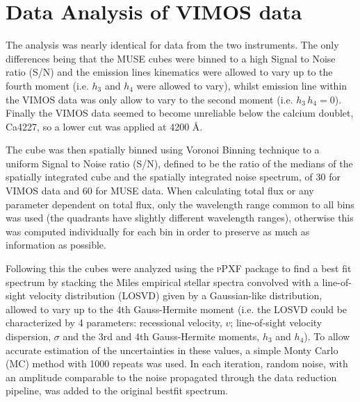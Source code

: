 \documentclass[fleqn,usenatbib,useAMS]{mnras}
\begin{document}


\section{Data Analysis of VIMOS data}
	\label{sec:analysis}
	The analysis was nearly identical for data from the two instruments. The only differences being that the MUSE cubes were binned to a high Signal to Noise ratio (S/N) and the emission lines kinematics were allowed to vary up to the fourth moment (i.e. $h_3$ and $h_4$ were allowed to vary), whilst emission line within the VIMOS data was only allow to vary to the second moment (i.e. $h_3 \, h_4 = 0$). Finally the VIMOS data seemed to become unreliable below the calcium doublet, Ca4227, so a lower cut was applied at 4200 \AA. 


	The cube was then spatially binned using Voronoi Binning technique \citep{Cappellari2003} to a uniform Signal to Noise ratio (S/N), defined to be the ratio of the medians of the spatially integrated cube and the spatially integrated noise spectrum, of 30 for VIMOS data and 60 for MUSE data. %
	When calculating total flux or any parameter dependent on total flux, only the wavelength range common to all bins was used (the quadrants have slightly different wavelength ranges), otherwise this was computed individually for each bin in order to preserve as much as information as possible.

	Following this the cubes were analyzed using the \textsc{pPXF} package \citep{Cappellari2004} to find a best fit spectrum by stacking the Miles empirical stellar spectra \citep{Sanchez-Blazquez2006} convolved with a line-of-sight velocity distribution (LOSVD) given by a Gaussian-like distribution, allowed to vary up to the 4th Gauss-Hermite moment (i.e. the LOSVD could be characterized by 4 parameters: recessional velocity, $v$; line-of-sight velocity dispersion, $\sigma$ and the 3rd and 4th Gauss-Hermite moments, $h_3$ and $h_4$). To allow accurate estimation of the uncertainties in these values, a simple Monty Carlo (MC) method with 1000 repeats was used. In each iteration, random noise, with an amplitude comparable to the noise propagated through the data reduction pipeline, was added to the original bestfit spectrum.
\end{document}
